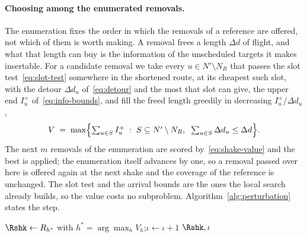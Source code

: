\paragraph{Choosing among the enumerated removals.}
The enumeration fixes the order in which the removals of a reference are offered, not which of them is worth making. A removal frees a length $\Delta d$ of flight, and what that length can buy is the information of the unscheduled targets it makes insertable. For a candidate removal we take every $u \in N' \setminus N_R$ that passes the slot test~\eqref{eq:slot-test} somewhere in the shortened route, at its cheapest such slot, with the detour $\Delta d_u$ of~\eqref{eq:detour} and the most that slot can give, the upper end $I^+_u$ of~\eqref{eq:info-bounds}, and fill the freed length greedily in decreasing $I^+_u / \Delta d_u$,
\begin{equation}\label{eq:shake-value}
    V \;=\; \max \Bigl\{ \textstyle\sum_{u \in S} I^+_u \;:\; S \subseteq N' \setminus N_R, \;\; \textstyle\sum_{u \in S} \Delta d_u \le \Delta d \Bigr\} .
\end{equation}
The next $m$ removals of the enumeration are scored by~\eqref{eq:shake-value} and the best is applied; the enumeration itself advances by one, so a removal passed over here is offered again at the next shake and the coverage of the reference is unchanged. The slot test and the arrival bounds are the ones the local search already builds, so the value costs no subproblem. Algorithm~\ref{alg:perturbation} states the step.

\begin{algorithm}[!htbp]
\SetAlgoVlined
\LinesNumbered
\caption{Shake step}\label{alg:perturbation}
\BlankLine
{}
$\Rshk \leftarrow R_{h^*}$ with $h^* = \arg\max_h V_h$;\quad $\iota \leftarrow \iota + 1$\;
\Return $\Rshk, \iota$
\end{algorithm}

